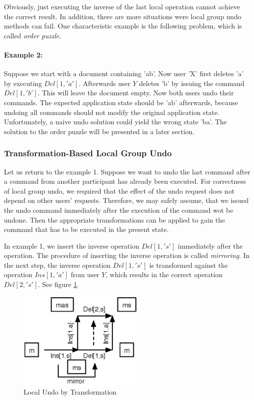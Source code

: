 Obviously, just executing the inverse of the last local operation cannot achieve the correct result. In addition, there are more situations were local group undo methods can fail. One characteristic example is the following problem, which is called \emph{order puzzle}.

\paragraph{Example 2:}
Suppose we start with a document containing 'ab'. Now user 'X' first deletes 'a' by executing $Del[1,'a']$. Afterwards user $Y$ deletes 'b' by issuing the command $Del[1,'b']$. This will leave the document empty. Now both users undo their commands. The expected application state should be 'ab' afterwards, because undoing all commands should not modify the original application state. Unfortunately, a naive undo solution could yield the wrong state 'ba'. The solution to the order puzzle will be presented in a later section.

\subsubsection{Transformation-Based Local Group Undo}
Let us return to the example 1. Suppose we want to undo the last command after a command from another participant has already been executed. For correctness of local group undo, we required that the effect of the undo request does not depend on other users' requests. Therefore, we may safely assume, that we issued the undo command immediately after the execution of the command wot be undone. Then the appropriate transformations can be applied to gain the command that has to be executed in the present state. 

In example 1, we insert the inverse operation $Del[1,'s']$ immediately after the operation. The procedure of inserting the inverse operation is called \emph{mirroring}. In the next step, the inverse operation $Del[1,'s']$ is transformed against the operation $Ins[1,'a']$ from user $Y$, which results in the correct operation $Del[2,'s']$. See figure \ref{fig:concepts.undobytransformation}.

\begin{figure}[htb]
 \centering
 \includegraphics[width=6.13cm,height=4.79cm]{../../images/concepts_undobytransformation.eps}
 \caption{Local Undo by Transformation}
 \label{fig:concepts.undobytransformation}
\end{figure}

